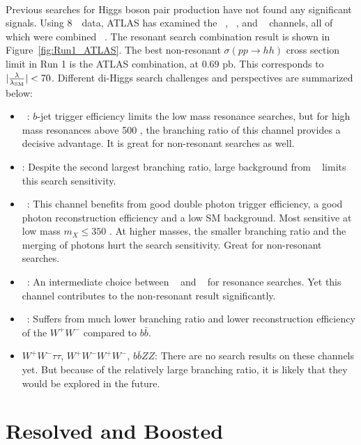\paragraph{}
Previous searches for Higgs boson pair production have not found any significant signals. 
Using 8~\TeV\ data, ATLAS has examined the \bbbb~\cite{Aad:2015uka}, \bbgg~\cite{HIGG-2013-29}, \bbtautau and \WWgg~ channels, all of which were combined ~\cite{Aad:2015xja}. 
The resonant search combination result is shown in Figure~\ref{fig:Run1_ATLAS}. 
The best non-resonant $\sigma(pp \to hh)$ cross section limit in Run 1 is the ATLAS combination, at $0.69$ pb. This corresponds to $|\frac{\rm \lambda}{\rm \lambda_{\rm SM}}| <70$. 
Different di-Higgs search challenges and perspectives are summarized below:
\begin{itemize}
	\item \bbbb~: $b$-jet trigger efficiency limits the low mass resonance searches, but for high mass resonances above 500 \GeV, the branching ratio of this channel provides a decisive advantage. It is great for non-resonant searches as well.
	\item \bbWW: Despite the second largest branching ratio, large background from \ttbar~ limits this search sensitivity.
	\item \bbgg~: This channel benefits from good double photon trigger efficiency, a good photon reconstruction efficiency and a low SM background. Most sensitive at low mass $m_{X} \leq 350$ \GeV. At higher masses, the smaller branching ratio and the merging of photons hurt the search sensitivity. Great for non-resonant searches.
	\item \bbtautau~: An intermediate choice between \bbbb~ and \bbgg~ for resonance searches. Yet this channel contributes to the non-resonant result significantly.
	\item \WWgg~: Suffers from much lower branching ratio and lower reconstruction efficiency of the $W^+W^-$ compared to $b\bar{b}$.
	\item $W^+W^-\tau\tau$, $W^+W^-W^+W^-$, $b\bar{b}ZZ$: There are no search results on these channels yet. But because of the relatively large branching ratio, it is likely that they would be explored in the future.
\end{itemize}


\section{Resolved and Boosted}

